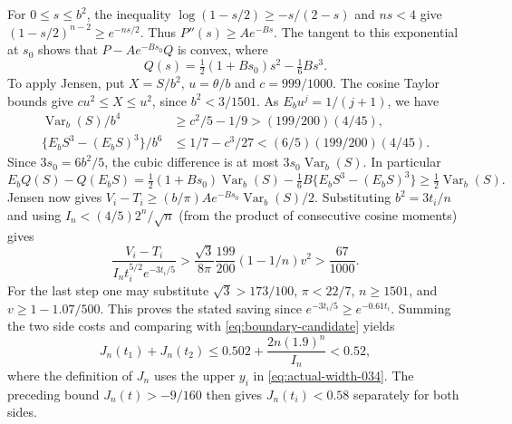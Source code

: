 \documentclass[11pt]{article}
\begin{document}
	For $0\leq s\leq b^2$, the inequality
	$\log(1-s/2)\geq-s/(2-s)$ and $ns<4$ give
	$(1-s/2)^{n-2}\geq e^{-ns/2}$. Thus $P''(s)\geq A e^{-Bs}$.
	The tangent to this exponential at $s_0$ shows that
	$P-Ae^{-Bs_0}Q$ is convex, where
	\[
	Q(s)=\tfrac12(1+Bs_0)s^2-\tfrac16Bs^3 .
	\]
	To apply Jensen, put $X=S/b^2$, $u=\theta/b$ and $c=999/1000$.
	The cosine Taylor bounds give $cu^2\leq X\leq u^2$, since
	$b^2<3/1501$. As $E_bu^j=1/(j+1)$, we have
	\begin{align*}
		\operatorname{Var}_b(S)/b^4
		&\geq c^2/5-1/9> (199/200)(4/45),\\
		\{E_b S^3-(E_b S)^3\}/b^6
		&\leq 1/7-c^3/27<(6/5)(199/200)(4/45).
	\end{align*}
	Since $3s_0=6b^2/5$, the cubic difference is at most
	$3s_0\operatorname{Var}_b(S)$. In particular
	\[
	E_bQ(S)-Q(E_b S)
	=\tfrac12(1+Bs_0)\operatorname{Var}_b(S)
	-\tfrac16B\{E_bS^3-(E_b S)^3\}
	\geq\tfrac12\operatorname{Var}_b(S).
	\]
	Jensen now gives $V_i-T_i\geq (b/\pi)Ae^{-Bs_0}
	\operatorname{Var}_b(S)/2$. Substituting $b^2=3t_i/n$ and using
	$I_n<(4/5)2^n/\sqrt n$ (from the product of consecutive cosine
	moments) gives
	\[
	\frac{V_i-T_i}{I_n t_i^{5/2}e^{-3t_i/5}}
	>\frac{\sqrt3}{8\pi}\frac{199}{200}(1-1/n)v^2
	>\frac{67}{1000}.
	\]
	For the last step one may substitute $\sqrt3>173/100$,
	$\pi<22/7$, $n\geq1501$, and $v\geq1-1.07/500$.
	This proves the stated saving since $e^{-3t_i/5}\geq e^{-0.61t_i}$.
	Summing the two side costs and comparing with
	\eqref{eq:boundary-candidate} yields
	\begin{equation}\label{eq:actual-joint-J}
		J_n(t_1)+J_n(t_2)
		\leq0.502+\frac{2n(1.9)^n}{I_n}<0.52,
	\end{equation}
	where the definition of $J_n$ uses the upper $y_i$ in
	\eqref{eq:actual-width-034}.  The preceding bound $J_n(t)>-9/160$ then gives $J_n(t_i)<0.58$ separately for both sides.
	
\end{document}
